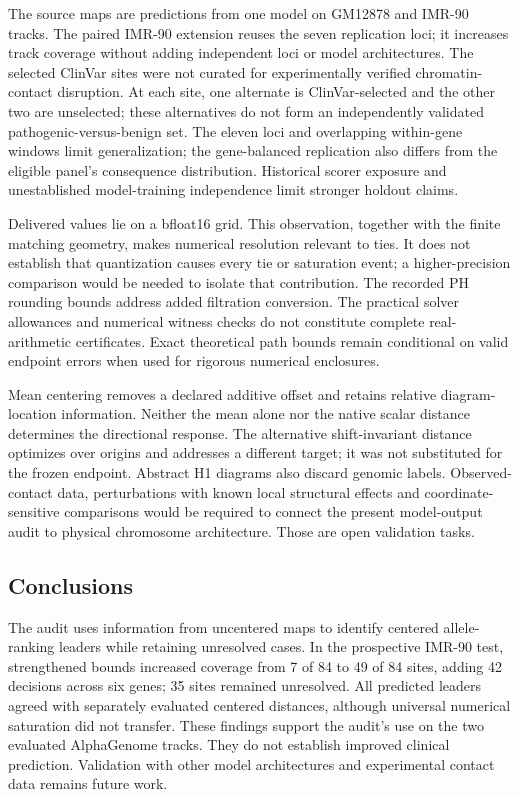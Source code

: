 \documentclass[
  11pt,
]{article}
\begin{document}
The source maps are predictions from one model on GM12878 and IMR-90
tracks. The paired IMR-90 extension reuses the seven replication loci;
it increases track coverage without adding independent loci or model
architectures. The selected ClinVar sites were not curated for
experimentally verified chromatin-contact disruption. At each site, one
alternate is ClinVar-selected and the other two are unselected; these
alternatives do not form an independently validated
pathogenic-versus-benign set. The eleven loci and overlapping
within-gene windows limit generalization; the gene-balanced replication
also differs from the eligible panel's consequence distribution.
Historical scorer exposure and unestablished model-training independence
limit stronger holdout claims.

Delivered values lie on a bfloat16 grid. This observation, together with
the finite matching geometry, makes numerical resolution relevant to
ties. It does not establish that quantization causes every tie or
saturation event; a higher-precision comparison would be needed to
isolate that contribution. The recorded PH rounding bounds address added
filtration conversion. The practical solver allowances and numerical
witness checks do not constitute complete real-arithmetic certificates.
Exact theoretical path bounds remain conditional on valid endpoint
errors when used for rigorous numerical enclosures.

Mean centering removes a declared additive offset and retains relative
diagram-location information. Neither the mean alone nor the native
scalar distance determines the directional response. The alternative
shift-invariant distance optimizes over origins and addresses a
different target; it was not substituted for the frozen endpoint.
Abstract H1 diagrams also discard genomic labels. Observed-contact data,
perturbations with known local structural effects and
coordinate-sensitive comparisons would be required to connect the
present model-output audit to physical chromosome architecture. Those
are open validation tasks.

\vspace{-0.5\baselineskip}

\subsection{Conclusions}\label{conclusions}

\vspace{-0.5\baselineskip}

The audit uses information from uncentered maps to identify centered
allele-ranking leaders while retaining unresolved cases. In the
prospective IMR-90 test, strengthened bounds increased coverage from 7
of 84 to 49 of 84 sites, adding 42 decisions across six genes; 35 sites
remained unresolved. All predicted leaders agreed with separately
evaluated centered distances, although universal numerical saturation
did not transfer. These findings support the audit's use on the two
evaluated AlphaGenome tracks. They do not establish improved clinical
prediction. Validation with other model architectures and experimental
contact data remains future work.
\end{document}
